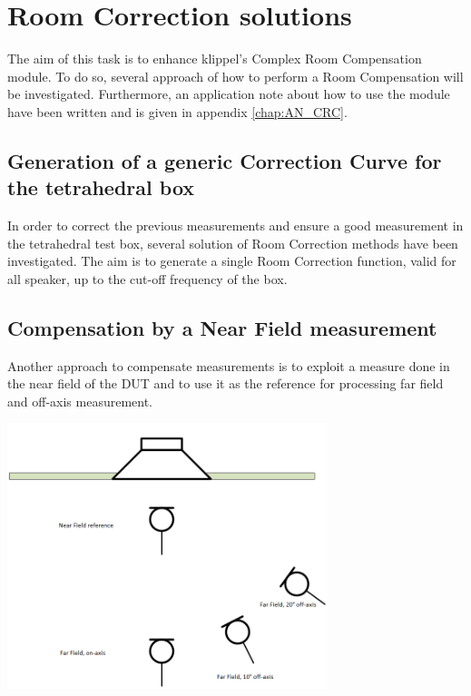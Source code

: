 \documentclass{report}
\begin{document}
\section{Room Correction solutions}

The aim of this task is to enhance klippel's Complex Room Compensation module. To do so, several approach of how to perform a Room Compensation will be investigated. Furthermore, an application note about how to use the module have been written and is given in appendix \ref{chap:AN_CRC}.


\subsection{Generation of a generic Correction Curve for the tetrahedral box}
In order to correct the previous measurements and ensure a good measurement in the tetrahedral test box, several solution of Room Correction methods have been investigated. The aim is to generate a single Room Correction function, valid for all speaker, up to the cut-off frequency of the box.

\subsection{Compensation by a Near Field measurement}

Another approach to compensate measurements is to exploit a measure done in the near field of the DUT and to use it as the reference for processing far field and off-axis measurement. 

\begin{minipage}{0.4\textwidth}
\begin{center}
	\includegraphics[width=0.7\textwidth]{RoomComp/NFFF_Setup} 
    \captionsetup{hypcap=false} 
	\label{fig:SetupNFFF}
\end{center}
\end{minipage}
\begin{minipage}{0.6\textwidth}

\end{minipage}
\end{document}
